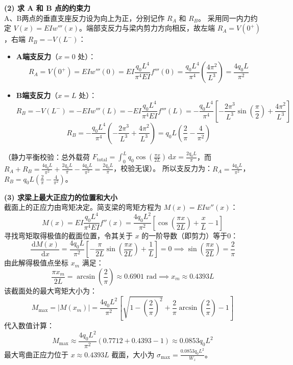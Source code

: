 \documentclass[11pt,a4paper]{ctexrep}
\newcommand{\diff}{\,\mathrm{d}}
\begin{document}
{\textbf{(2) 求 A 和 B 点的约束力} \\
A、B两点的垂直支座反力设为向上为正，分别记作 $R_A$ 和 $R_B$。
采用同一内力约定 $V(x)=EIw'''(x)$。端部支反力与梁内剪力方向相反，故左端 $R_A=V(0^+)$，右端 $R_B=-V(L^-)$：
\begin{itemize}
    \item \textbf{A端支反力}（$x = 0$ 处）：
          \[
              R_A = V(0^+) = EI w'''(0) = EI \frac{q_0 L^4}{\pi^4 EI} f'''(0) 
              = \frac{q_0 L^4}{\pi^4} \left( \frac{4\pi^2}{L^3} \right) = \frac{4 q_0 L}{\pi^2}
          \]
    \item \textbf{B端支反力}（$x = L$ 处）：
          \[
              R_B = -V(L^-) = -EI w'''(L) = -EI \frac{q_0 L^4}{\pi^4 EI} f'''(L)
              = -\frac{q_0 L^4}{\pi^4} \left[ -\frac{2\pi^3}{L^3} \sin\left(\frac{\pi}{2}\right) + \frac{4\pi^2}{L^3} \right] 
          \]
          \[
              R_B = -\frac{q_0 L^4}{\pi^4} \left( -\frac{2\pi^3}{L^3} + \frac{4\pi^2}{L^3} \right) = q_0 L \left( \frac{2}{\pi} - \frac{4}{\pi^2} \right)
          \]
\end{itemize}
（静力平衡校验：总外载荷 $F_{\text{total}} = \int_0^L q_0 \cos(\frac{\pi x}{2L}) \diff x = \frac{2q_0 L}{\pi}$，而 $R_A + R_B = \frac{4q_0 L}{\pi^2} + \frac{2q_0 L}{\pi} - \frac{4q_0 L}{\pi^2} = \frac{2q_0 L}{\pi}$，校验无误）。
所以支反力为：\textbf{$R_A = \frac{4 q_0 L}{\pi^2}$}， \textbf{$R_B = q_0 L \left( \frac{2}{\pi} - \frac{4}{\pi^2} \right)$}。

\textbf{(3) 求梁上最大正应力的位置和大小} \\
截面上的正应力由弯矩决定。简支梁的弯矩方程为 $M(x) = EI w''(x)$：
\[
    M(x) = EI \frac{q_0 L^4}{\pi^4 EI} f''(x) = \frac{4 q_0 L^2}{\pi^2} \left[ \cos\left(\frac{\pi x}{2L}\right) + \frac{x}{L} - 1 \right]
\]
寻找弯矩取得极值的截面位置，令其关于 $x$ 的一阶导数（即剪力）等于0：
\[
    \frac{\diff M(x)}{\diff x} = \frac{4 q_0 L}{\pi^2} \left[ -\frac{\pi}{2L} \sin\left(\frac{\pi x}{2L}\right) + \frac{1}{L} \right] = 0 \implies \sin\left(\frac{\pi x}{2L}\right) = \frac{2}{\pi}
\]
由此解得极值点坐标 $x_m$ 满足：
\[
    \frac{\pi x_m}{2L} = \arcsin\left(\frac{2}{\pi}\right) \approx 0.6901\text{ rad} \implies x_m \approx 0.4393 L
\]
该截面处的最大弯矩大小为：
\[
    M_{\max} = |M(x_m)| = \frac{4 q_0 L^2}{\pi^2} \left[ \sqrt{1 - \left(\frac{2}{\pi}\right)^2} + \frac{2}{\pi} \arcsin\left(\frac{2}{\pi}\right) - 1 \right]
\]
代入数值计算：
\[
    M_{\max} \approx \frac{4 q_0 L^2}{\pi^2} \left( 0.7712 + 0.4393 - 1 \right) \approx 0.0853 q_0 L^2
\]
最大弯曲正应力位于 \textbf{$x \approx 0.4393 L$} 截面，大小为 \textbf{$\sigma_{\max} = \frac{0.0853 q_0 L^2}{W_z}$}。

}
\end{document}

